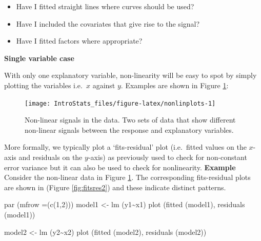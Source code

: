 \documentclass[
  oneside]{krantz}
\newenvironment{Shaded}{\begin{snugshade}}{\end{snugshade}}
\newcommand{\AttributeTok}[1]{\textcolor[rgb]{0.77,0.63,0.00}{#1}}
\newcommand{\DecValTok}[1]{\textcolor[rgb]{0.00,0.00,0.81}{#1}}
\newcommand{\FunctionTok}[1]{\textcolor[rgb]{0.00,0.00,0.00}{#1}}
\newcommand{\NormalTok}[1]{#1}
\newcommand{\OtherTok}[1]{\textcolor[rgb]{0.56,0.35,0.01}{#1}}
\newcommand{\SpecialCharTok}[1]{\textcolor[rgb]{0.00,0.00,0.00}{#1}}
\providecommand{\tightlist}{%
  \setlength{\itemsep}{0pt}\setlength{\parskip}{0pt}}
\begin{document}
\begin{itemize}
\tightlist
\item
  Have I fitted straight lines where curves should be used?
\item
  Have I included the covariates that give rise to the signal?
\item
  Have I fitted factors where appropriate?
\end{itemize}

\textbf{Single variable case}

With only one explanatory variable, non-linearity will be easy to spot by simply plotting the variables i.e.~\(x\) against \(y\). Examples are shown in Figure \ref{fig:nonlinplots}:

\begin{figure}

{\centering \texttt{[image: IntroStats\_files/figure-latex/nonlinplots-1]} 

}

\caption{Non-linear signals in the data. Two sets of data that show different non-linear signals between the response and explanatory variables.}\label{fig:nonlinplots}
\end{figure}

More formally, we typically plot a `fits-residual' plot (i.e.~fitted values on the \(x\)-axis and residuals on the \(y\)-axis) as previously used to check for non-constant error variance but it can also be used to check for nonlinearity.
\textbf{Example} Consider the non-linear data in Figure \ref{fig:nonlinplots}. The corresponding fits-residual plots are shown in (Figure \ref{fig:fitsres2}) and these indicate distinct patterns.

\begin{Shaded}
\begin{Highlighting}[]
\FunctionTok{par}\NormalTok{ (}\AttributeTok{mfrow =}\NormalTok{(}\FunctionTok{c}\NormalTok{(}\DecValTok{1}\NormalTok{,}\DecValTok{2}\NormalTok{)))}
\NormalTok{model1 }\OtherTok{\textless{}{-}} \FunctionTok{lm}\NormalTok{ (y1}\SpecialCharTok{\textasciitilde{}}\NormalTok{x1)}
\FunctionTok{plot}\NormalTok{ (}\FunctionTok{fitted}\NormalTok{ (model1), }\FunctionTok{residuals}\NormalTok{ (model1))}

\NormalTok{model2 }\OtherTok{\textless{}{-}} \FunctionTok{lm}\NormalTok{ (y2}\SpecialCharTok{\textasciitilde{}}\NormalTok{x2)}
\FunctionTok{plot}\NormalTok{ (}\FunctionTok{fitted}\NormalTok{ (model2), }\FunctionTok{residuals}\NormalTok{ (model2))}
\end{Highlighting}
\end{Shaded}
\end{document}
